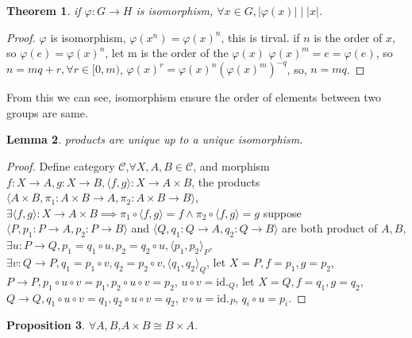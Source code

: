\documentclass[10pt,a4paper]{article}
\newtheorem{theorem}{Theorem}[section]
\newtheorem{lemma}[theorem]{Lemma}
\newtheorem{proposition}[theorem]{Proposition}
\begin{document}
\begin{theorem}
    if $\varphi:G\to H$ is isomorphism, $\forall x\in G,|\varphi(x)|\mid|x|$.
\end{theorem}
\begin{proof}
    $\varphi$ is isomorphism, $\varphi(x^n)=\varphi(x)^n$, this is tirval.
    if $n$ is the order of $x$, so $\varphi(e)=\varphi(x)^n$, let m is the order of the $\varphi(x)$
    $\varphi(x)^m=e=\varphi(e)$, so $n=mq+r,\forall r\in[0,m)$, $\varphi(x)^r=\varphi(x)^n(\varphi(x)^m)^{-q}$,
    so, $n=mq$.
\end{proof}
From this we can see, isomorphism ensure the order of elements between two groups are same.
\begin{lemma}
    products are unique up to a unique isomorphism.
\end{lemma}
\begin{proof}
    Define category $\mathcal{C}$,$\forall X,A,B\in\mathcal{C}$, and morphism $f:X\to A,g:X\to B,\langle f,g\rangle:X\to A\times B$, 
    the products 
    $\langle A\times B,
    \pi_1:A\times B\to A,
    \pi_2:A\times B\to B\rangle$, 
    $\exists\langle f,g\rangle:X\to A\times B\implies\pi_1\circ\langle f,g\rangle=f\land\pi_2\circ\langle f,g\rangle=g$
    suppose $\langle P,p_1:P\to A,p_2:P\to B\rangle$ and 
    $\langle Q,q_1:Q\to A,q_2:Q\to B\rangle$ are both product of $A,B$,
    $\exists u:P\to Q,p_1=q_1\circ u,p_2=q_2\circ u,\langle p_1,p_2\rangle_{P}$,
    $\exists v:Q\to P,q_1=p_1\circ v,q_2=p_2\circ v,\langle q_1,q_2\rangle_{Q}$,
    let $X=P,f=p_1,g=p_2$,
    $P\to P,p_1\circ u\circ v=p_1,p_2\circ u\circ v=p_2$,
    $u\circ v=\mathrm{id.}_Q$,
    let $X=Q,f=q_1,g=q_2$,
    $Q\to Q,q_1\circ u\circ v=q_1,q_2\circ u\circ v=q_2$,
    $v\circ u=\mathrm{id.}_P$,
    $q_i\circ u=p_i$.
\end{proof}
\begin{proposition}
    $\forall A,B$,$A\times B\cong B\times A$.
\end{proposition}
\end{document}
